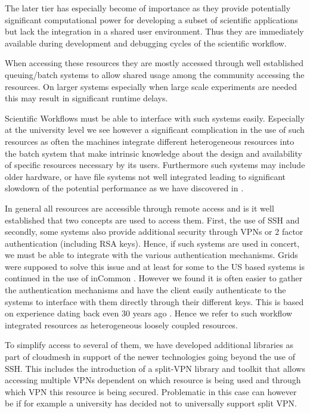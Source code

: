 \documentclass[utf8]{FrontiersinVancouver} %
\begin{document}
The later tier has especially become of importance as they provide potentially
significant computational power for developing a subset of scientific
applications but lack the integration in a shared
user environment. Thus they are immediately available during development
and debugging cycles of the scientific workflow.

When accessing these resources they are mostly accessed through well
established queuing/batch systems to allow shared usage among the
community accessing the resources. On larger systems especially when
large scale experiments are needed this may result in significant
runtime delays.

Scientific Workflows must be able to interface with such systems
easily. Especially at the university level we see however a
significant complication in the use of such resources as often the
machines integrate different heterogeneous resources into the batch
system that make intrinsic knowledge about the design and
availability of specific resources necessary by its users. Furthermore
such systems may include older hardware, or have file systems not well
integrated leading to significant slowdown of the potential
performance as we have discovered in \citep{earthquake?}.

In general all resources are accessible through remote access and is
it well established that two concepts are used to access them. First,
the use of SSH and secondly, some systems also provide additional
security through VPNs or 2 factor authentication (including RSA
keys). Hence, if such systems are used in concert, we must be able to
integrate with the various authentication mechanisms. Grids were
supposed to solve this issue and at least for some to the US based
systems is continued in the use of inCommon \citep{incommon}. However we found it is
often easier to gather the authentication mechanisms and have the
client easily authenticate to the systems to interface with them
directly through their different keys. This is based on experience
dating back even 30 years ago \cite{las-99-loosely}. Hence we refer to such workflow integrated resources as heterogeneous loosely coupled resources.

To simplify access to several of them, we have developed additional libraries as part of cloudmesh in
support of the newer technologies going beyond the use of SSH. This includes the introduction of a split-VPN library and toolkit that allows accessing multiple VPNs dependent on which resource is being used and through which VPN this resource is being secured. Problematic in this case can however be if for example a university has decided not to universally support split VPN.
\end{document}

